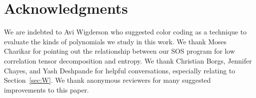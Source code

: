 \section*{Acknowledgments}

We are indebted to Avi Wigderson who suggested color coding as a technique to evaluate the kinds of polynomials we study in this work.
We thank Moses Charikar for pointing out the relationship between our SOS program for low correlation tensor decomposition and \Renyi entropy.
We thank Christian Borgs, Jennifer Chayes, and Yash Deshpande for helpful conversations, especially relating to Section~\ref{sec:W}.
We thank anonymous reviewers for many suggested improvements to this paper.


%